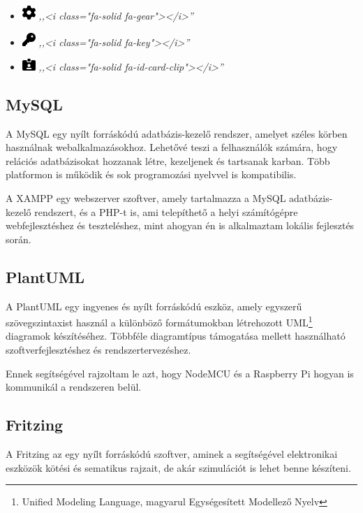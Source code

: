 \documentclass[
]{thesis-ekf}
\theoremstyle{definition}
\theoremstyle{remark}
\begin{document}
\begin{itemize}
		\item \includegraphics[width=0.5cm]{./src/icons/gear-solid}
			\emph{,,<i class="fa-solid fa-gear"></i>''}
			
		\item \includegraphics[width=0.5cm]{./src/icons/key-solid}
			\emph{,,<i class="fa-solid fa-key"></i>''}
			
		\item \includegraphics[width=0.5cm]{./src/icons/id-card-clip-solid}
			\emph{,,<i class="fa-solid fa-id-card-clip"></i>''}
			
	\end{itemize}
	\subsection{MySQL}
	A MySQL egy nyílt forráskódú adatbázis-kezelő rendszer, amelyet széles körben használnak webalkalmazásokhoz. Lehetővé teszi a felhasználók számára, hogy relációs adatbázisokat hozzanak létre, kezeljenek és tartsanak karban. Több platformon is működik és sok programozási nyelvvel is kompatibilis.
	
	A XAMPP egy webszerver szoftver, amely tartalmazza a MySQL adatbázis-kezelő rendszert, és a PHP-t is, ami telepíthető a helyi számítógépre webfejlesztéshez és teszteléshez, mint ahogyan én is alkalmaztam lokális fejlesztés során.
	\subsection{PlantUML}
	A PlantUML egy ingyenes és nyílt forráskódú eszköz, amely egyszerű szövegszintaxist használ a különböző formátumokban létrehozott UML\footnote{Unified Modeling Language, magyarul Egységesített Modellező Nyelv} diagramok készítéséhez. Többféle diagramtípus támogatása mellett használható szoftverfejlesztéshez és rendszertervezéshez.

	Ennek segítségével rajzoltam le azt, hogy NodeMCU és a Raspberry Pi hogyan is kommunikál a rendszeren belül.
	\subsection{Fritzing}
	A Fritzing az egy nyílt forráskódú szoftver, aminek a segítségével elektronikai eszközök kötési és sematikus rajzait, de akár szimulációt is lehet benne készíteni.
	
\end{document}
